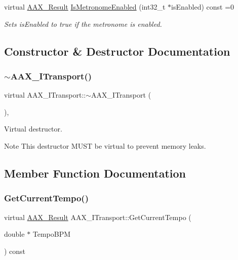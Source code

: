 \begin{DoxyCompactItemize}
virtual \mbox{\hyperlink{a00392_a4d8f69a697df7f70c3a8e9b8ee130d2f}{A\+A\+X\+\_\+\+Result}} \mbox{\hyperlink{a01885_af5f63a44a115d868aaef2e4a131fb865}{Is\+Metronome\+Enabled}} (int32\+\_\+t $\ast$is\+Enabled) const =0
\begin{DoxyCompactList}\small\item\em Sets is\+Enabled to true if the metronome is enabled. \end{DoxyCompactList}\end{DoxyCompactItemize}


\subsection{Constructor \& Destructor Documentation}
\mbox{\label{a01885_a12f99a509f2a4b5e3ca0bfe9f850d0a9}} 
\subsubsection{\texorpdfstring{$\sim$AAX\_ITransport()}{~AAX\_ITransport()}}
{\footnotesize\ttfamily virtual A\+A\+X\+\_\+\+I\+Transport\+::$\sim$\+A\+A\+X\+\_\+\+I\+Transport (\begin{DoxyParamCaption}{ }\end{DoxyParamCaption})\hspace{0.3cm}{\ttfamily [inline]}, {\ttfamily [virtual]}}



Virtual destructor. 

\begin{DoxyNote}{Note}
This destructor M\+U\+ST be virtual to prevent memory leaks. 
\end{DoxyNote}


\subsection{Member Function Documentation}
\mbox{\label{a01885_a006d7fdcc06c2c94209eeed846dfc068}} 
\subsubsection{\texorpdfstring{GetCurrentTempo()}{GetCurrentTempo()}}
{\footnotesize\ttfamily virtual \mbox{\hyperlink{a00392_a4d8f69a697df7f70c3a8e9b8ee130d2f}{A\+A\+X\+\_\+\+Result}} A\+A\+X\+\_\+\+I\+Transport\+::\+Get\+Current\+Tempo (\begin{DoxyParamCaption}\item[{double $\ast$}]{Tempo\+B\+PM }\end{DoxyParamCaption}) const\hspace{0.3cm}{\ttfamily [pure virtual]}}



